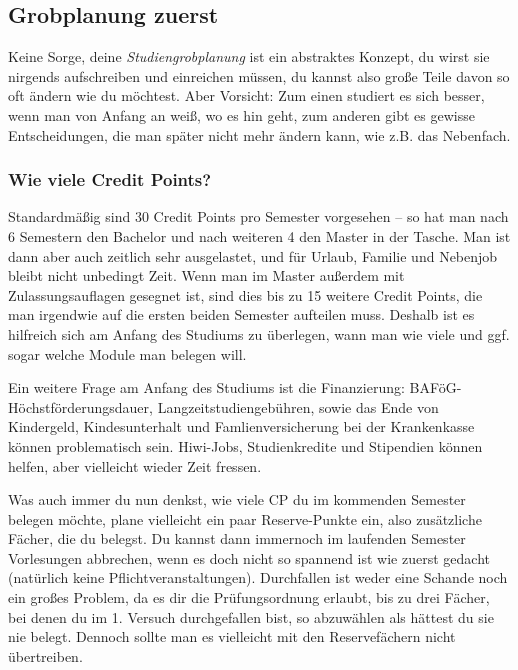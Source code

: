 
\subsection{Grobplanung zuerst}
\label{grob}
	Keine Sorge, deine \textit{Studiengrobplanung} ist ein abstraktes Konzept, du wirst sie nirgends aufschreiben und einreichen müssen, du kannst also große Teile davon so oft ändern wie du möchtest. Aber Vorsicht: Zum einen studiert es sich besser, wenn man von Anfang an weiß, wo es hin geht, zum anderen gibt es gewisse Entscheidungen, die man später nicht mehr ändern kann, wie z.B. das Nebenfach.

\subsubsection{Wie viele Credit Points?}
	Standardmäßig sind 30 Credit Points pro Semester vorgesehen -- so hat man nach 6 Semestern den Bachelor und nach weiteren 4 den Master in der Tasche. Man ist dann aber auch zeitlich sehr ausgelastet, und für Urlaub, Familie und Nebenjob bleibt nicht unbedingt Zeit. Wenn man im Master außerdem mit Zulassungsauflagen gesegnet ist, sind dies bis zu 15 weitere Credit Points, die man irgendwie auf die ersten beiden Semester aufteilen muss. Deshalb ist es hilfreich sich am Anfang des Studiums zu überlegen, wann man wie viele und ggf. sogar welche Module man belegen will.

	Ein weitere Frage am Anfang des Studiums ist die Finanzierung:
	BAFöG-Höchstförderungsdauer, Langzeitstudiengebühren, sowie das
	Ende von Kindergeld, Kindesunterhalt und Famlienversicherung bei
	der Krankenkasse können problematisch sein. Hiwi-Jobs,
	Studienkredite und Stipendien können helfen, aber vielleicht
	wieder Zeit fressen. 

	Was auch immer du nun denkst, wie viele CP du im kommenden Semester belegen möchte, plane vielleicht ein paar Reserve-Punkte ein, also zusätzliche Fächer, die du belegst. Du kannst dann immernoch im laufenden Semester Vorlesungen abbrechen, wenn es doch nicht so spannend ist wie zuerst gedacht (natürlich keine Pflichtveranstaltungen). Durchfallen ist weder eine Schande noch ein großes Problem, da es dir die Prüfungsordnung erlaubt, bis zu drei Fächer, bei denen du im 1. Versuch durchgefallen bist, so abzuwählen als hättest du sie nie belegt. Dennoch sollte man es vielleicht mit den Reservefächern nicht übertreiben.

